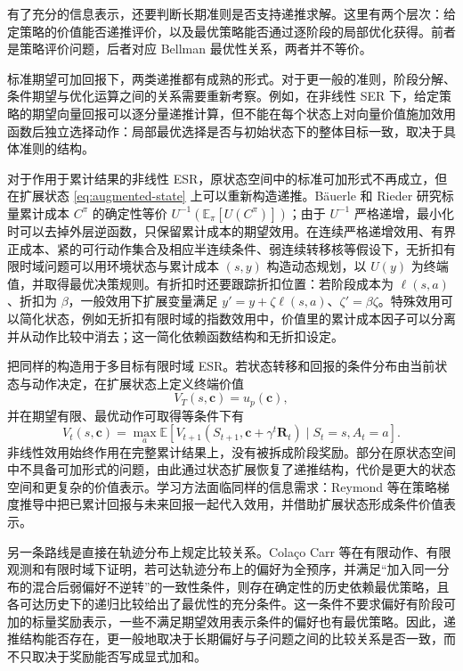 有了充分的信息表示，还要判断长期准则是否支持递推求解。这里有两个层次：给定策略的价值能否递推评价，以及最优策略能否通过逐阶段的局部优化获得。前者是策略评价问题，后者对应 Bellman 最优性关系，两者并不等价。

标准期望可加回报下，两类递推都有成熟的形式。对于更一般的准则，阶段分解、条件期望与优化运算之间的关系需要重新考察。例如，在非线性 SER 下，给定策略的期望向量回报可以逐分量递推计算，但不能在每个状态上对向量价值施加效用函数后独立选择动作：局部最优选择是否与初始状态下的整体目标一致，取决于具体准则的结构\cite{roijers2013}。

对于作用于累计结果的非线性 ESR，原状态空间中的标准可加形式不再成立，但在扩展状态 \eqref{eq:augmented-state} 上可以重新构造递推。Bäuerle 和 Rieder 研究标量累计成本 $C^\pi$ 的确定性等价 $U^{-1}(\mathbb E_\pi[U(C^\pi)])$；由于 $U^{-1}$ 严格递增，最小化时可以去掉外层逆函数，只保留累计成本的期望效用\cite{bauerle2014}。在连续严格递增效用、有界正成本、紧的可行动作集合及相应半连续条件、弱连续转移核等假设下，无折扣有限时域问题可以用环境状态与累计成本 $(s,y)$ 构造动态规划，以 $U(y)$ 为终端值，并取得最优决策规则。有折扣时还要跟踪折扣位置：若阶段成本为 $\ell(s,a)$、折扣为 $\beta$，一般效用下扩展变量满足 $y'=y+\zeta\ell(s,a)$、$\zeta'=\beta\zeta$。特殊效用可以简化状态，例如无折扣有限时域的指数效用中，价值里的累计成本因子可以分离并从动作比较中消去；这一简化依赖函数结构和无折扣设定。

把同样的构造用于多目标有限时域 ESR。若状态转移和回报的条件分布由当前状态与动作决定，在扩展状态上定义终端价值
\begin{equation}
V_T(s,\mathbf c)=u_p(\mathbf c),
\end{equation}
并在期望有限、最优动作可取得等条件下有
\begin{equation}
V_t(s,\mathbf c)
=
\max_a
\mathbb E\!\left[
V_{t+1}
\left(
S_{t+1},
\mathbf c+\gamma^t\mathbf R_t
\right)
\mid
S_t=s,A_t=a
\right].
\end{equation}
非线性效用始终作用在完整累计结果上，没有被拆成阶段奖励。部分在原状态空间中不具备可加形式的问题，由此通过状态扩展恢复了递推结构，代价是更大的状态空间和更复杂的价值表示。学习方法面临同样的信息需求：Reymond 等在策略梯度推导中把已累计回报与未来回报一起代入效用，并借助扩展状态形成条件价值表示\cite{reymond2023}。

另一条路线是直接在轨迹分布上规定比较关系。Colaço Carr 等在有限动作、有限观测和有限时域下证明，若可达轨迹分布上的偏好为全预序，并满足“加入同一分布的混合后弱偏好不逆转”的一致性条件，则存在确定性的历史依赖最优策略，且各可达历史下的递归比较给出了最优性的充分条件\cite{carr2024}。这一条件不要求偏好有阶段可加的标量奖励表示，一些不满足期望效用表示条件的偏好也有最优策略。因此，递推结构能否存在，更一般地取决于长期偏好与子问题之间的比较关系是否一致，而不只取决于奖励能否写成显式加和。

